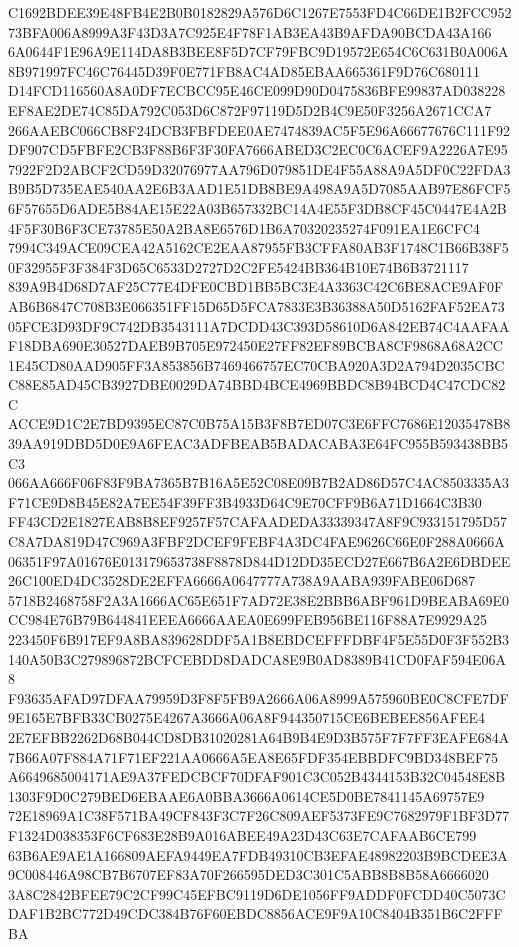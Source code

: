 \documentclass[UTF8,fontset=fandol,zihao=-4,a4paper]{ctexart}
\begin{document}
{{C1692BDEE39E48FB4E2B0B0182829A576D6C1267E7553FD4C66DE1B2FCC95273BFA006A8999A3F43D3A7C925E4F78F1AB3EA43B9AFDA90BCDA43A166
6A0644F1E96A9E114DA8B3BEE8F5D7CF79FBC9D19572E654C6C631B0A006A8B971997FC46C76445D39F0E771FB8AC4AD85EBAA665361F9D76C680111
D14FCD116560A8A0DF7ECBCC95E46CE099D90D0475836BFE99837AD038228EF8AE2DE74C85DA792C053D6C872F97119D5D2B4C9E50F3256A2671CCA7
266AAEBC066CB8F24DCB3FBFDEE0AE7474839AC5F5E96A66677676C111F92DF907CD5FBFE2CB3F88B6F3F30FA7666ABED3C2EC0C6ACEF9A2226A7E95
7922F2D2ABCF2CD59D32076977AA796D079851DE4F55A88A9A5DF0C22FDA3B9B5D735EAE540AA2E6B3AAD1E51DB8BE9A498A9A5D7085AAB97E86FCF5
6F57655D6ADE5B84AE15E22A03B657332BC14A4E55F3DB8CF45C0447E4A2B4F5F30B6F3CE73785E50A2BA8E6576D1B6A70320235274F091EA1E6CFC4
7994C349ACE09CEA42A5162CE2EAA87955FB3CFFA80AB3F1748C1B66B38F50F32955F3F384F3D65C6533D2727D2C2FE5424BB364B10E74B6B3721117
839A9B4D68D7AF25C77E4DFE0CBD1BB5BC3E4A3363C42C6BE8ACE9AF0FAB6B6847C708B3E066351FF15D65D5FCA7833E3B36388A50D5162FAF52EA73
05FCE3D93DF9C742DB3543111A7DCDD43C393D58610D6A842EB74C4AAFAAF18DBA690E30527DAEB9B705E972450E27FF82EF89BCBA8CF9868A68A2CC
1E45CD80AAD905FF3A853856B7469466757EC70CBA920A3D2A794D2035CBCC88E85AD45CB3927DBE0029DA74BBD4BCE4969BBDC8B94BCD4C47CDC82C
ACCE9D1C2E7BD9395EC87C0B75A15B3F8B7ED07C3E6FFC7686E12035478B839AA919DBD5D0E9A6FEAC3ADFBEAB5BADACABA3E64FC955B593438BB5C3
066AA666F06F83F9BA7365B7B16A5E52C08E09B7B2AD86D57C4AC8503335A3F71CE9D8B45E82A7EE54F39FF3B4933D64C9E70CFF9B6A71D1664C3B30
FF43CD2E1827EAB8B8EF9257F57CAFAADEDA33339347A8F9C933151795D57C8A7DA819D47C969A3FBF2DCEF9FEBF4A3DC4FAE9626C66E0F288A0666A
06351F97A01676E013179653738F8878D844D12DD35ECD27E667B6A2E6DBDEE26C100ED4DC3528DE2EFFA6666A0647777A738A9AABA939FABE06D687
5718B2468758F2A3A1666AC65E651F7AD72E38E2BBB6ABF961D9BEABA69E0CC984E76B79B644841EEEA6666AAEA0E699FEB956BE116F88A7E9929A25
223450F6B917EF9A8BA839628DDF5A1B8EBDCEFFFDBF4F5E55D0F3F552B3140A50B3C279896872BCFCEBDD8DADCA8E9B0AD8389B41CD0FAF594E06A8
F93635AFAD97DFAA79959D3F8F5FB9A2666A06A8999A575960BE0C8CFE7DF9E165E7BFB33CB0275E4267A3666A06A8F944350715CE6BEBEE856AFEE4
2E7EFBB2262D68B044CD8DB31020281A64B9B4E9D3B575F7F7FF3EAFE684A7B66A07F884A71F71EF221AA0666A5EA8E65FDF354EBBDFC9BD348BEF75
A6649685004171AE9A37FEDCBCF70DFAF901C3C052B4344153B32C04548E8B1303F9D0C279BED6EBAAE6A0BBA3666A0614CE5D0BE7841145A69757E9
72E18969A1C38F571BA49CF843F3C7F26C809AEF5373FE9C7682979F1BF3D77F1324D038353F6CF683E28B9A016ABEE49A23D43C63E7CAFAAB6CE799
63B6AE9AE1A166809AEFA9449EA7FDB49310CB3EFAE48982203B9BCDEE3A9C008446A98CB7B6707EF83A70F266595DED3C301C5ABB8B8B58A6666020
3A8C2842BFEE79C2CF99C45EFBC9119D6DE1056FF9ADDF0FCDD40C5073CDAF1B2BC772D49CDC384B76F60EBDC8856ACE9F9A10C8404B351B6C2FFFBA
}}
\end{document}
